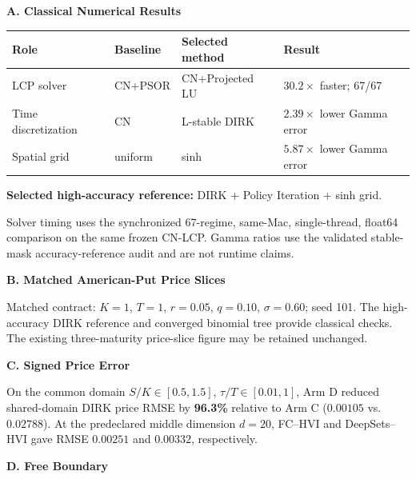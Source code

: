 
\textbf{A. Classical Numerical Results}

\begin{center}
\begin{tabular}{llll}
\hline
Role & Baseline & Selected method & Result \\
\hline
LCP solver & CN+PSOR & CN+Projected LU & $30.2\times$ faster; 67/67 \\
Time discretization & CN & L-stable DIRK & $2.39\times$ lower Gamma error \\
Spatial grid & uniform & sinh & $5.87\times$ lower Gamma error \\
\hline
\end{tabular}
\end{center}

\noindent\textbf{Selected high-accuracy reference:} DIRK + Policy Iteration + sinh grid.

\noindent\footnotesize
Solver timing uses the synchronized 67-regime, same-Mac, single-thread, float64 comparison on the same frozen CN-LCP. Gamma ratios use the validated stable-mask accuracy-reference audit and are not runtime claims.
\normalsize

\textbf{B. Matched American-Put Price Slices}

\noindent
Matched contract: $K=1$, $T=1$, $r=0.05$, $q=0.10$, $\sigma=0.60$; seed 101. The high-accuracy DIRK reference and converged binomial tree provide classical checks. The existing three-maturity price-slice figure may be retained unchanged.

\textbf{C. Signed Price Error}

\noindent
On the common domain $S/K\in[0.5,1.5]$, $\tau/T\in[0.01,1]$, Arm D reduced shared-domain DIRK price RMSE by \textbf{96.3\%} relative to Arm C ($0.00105$ vs. $0.02788$). At the predeclared middle dimension $d=20$, FC--HVI and DeepSets--HVI gave RMSE $0.00251$ and $0.00332$, respectively.

\textbf{D. Free Boundary}

